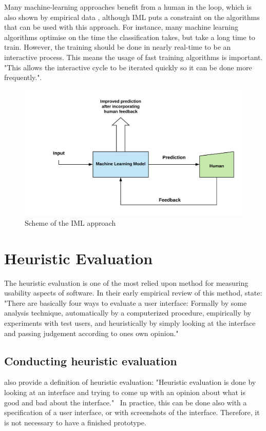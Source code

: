 \documentclass[sigchi]{acmart}
\begin{document}
Many machine-learning approaches benefit from a human in the loop\cite{humankernel2015}, which is also shown by empirical data \cite{imlexp2018}, although IML puts a constraint on the algorithms that can be used with this approach\cite{iml2003}. For instance, many machine learning algorithms optimise on the time the classification takes, but take a long time to train. However, the training should be done in nearly real-time to be an interactive process. This means the usage of fast training algorithms is important. "This  allows the interactive cycle to be iterated quickly so it can be done more frequently."\cite{iml2003}.
\begin{figure}[h]
  \centering
  \includegraphics[width=0.8\linewidth]{iml-scheme}
  \caption{Scheme of the IML approach\cite{whatiml2018}}
  \label{fig:iml}
\end{figure}

\section{Heuristic Evaluation}
The heuristic evaluation is one of the most relied upon method for measuring usability aspects of software. In their early empirical review of this method, \citeauthor{heureval1990} state:
"There are basically four ways to evaluate a user interface: Formally by some analysis technique, automatically by a computerized procedure, empirically by experiments with test users, and heuristically by simply looking at the interface and passing judgement according to ones own opinion."

\subsection{Conducting heuristic evaluation}

\citeauthor{heureval1990} also provide a definition of heuristic evaluation: "Heuristic evaluation is done by looking at an interface and trying to come up with an opinion about what is good and bad about the interface."~\cite{heureval1990} In practice, this can be done also with a specification of a user interface, or with screenshots of the interface. Therefore, it is not necessary to have a finished prototype.
\end{document}
